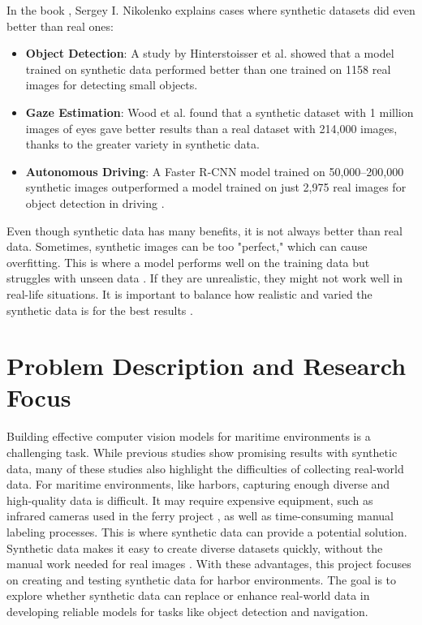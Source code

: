 \noindent In the book \cite{nikolenko2021synthetic}, Sergey I. Nikolenko explains cases where synthetic datasets did even better than real ones:
\begin{itemize}
    \item \textbf{Object Detection}: A study by Hinterstoisser et al. \cite{hinter} showed that a model trained on synthetic data performed better than one trained on 1158 real images for detecting small objects. 
    \item \textbf{Gaze Estimation}: Wood et al. \cite{wood} found that a synthetic dataset with 1 million images of eyes gave better results than a real dataset with 214,000 images, thanks to the greater variety in synthetic data. 
    \item \textbf{Autonomous Driving}: A Faster R-CNN model trained on 50,000--200,000 synthetic images outperformed a model trained on just 2,975 real images for object detection in driving \cite{r-cnn}.
\end{itemize}

\noindent Even though synthetic data has many benefits, it is not always better than real data. Sometimes, synthetic images can be too "perfect," which can cause overfitting. This is where a model performs well on the training data but struggles with unseen data \cite{Ying_2019}. If they are unrealistic, they might not work well in real-life situations. It is important to balance how realistic and varied the synthetic data is for the best results \cite{nikolenko2021synthetic}.


\section{Problem Description and Research Focus}
Building effective computer vision models for maritime environments is a challenging task. While previous studies show promising results with synthetic data, many of these studies also highlight the difficulties of collecting real-world data. For maritime environments, like harbors, capturing enough diverse and high-quality data is difficult. It may require expensive equipment, such as infrared cameras used in the ferry project \cite{NTNUFerry}, as well as time-consuming manual labeling processes. This is where synthetic data can provide a potential solution. \\

\noindent Synthetic data makes it easy to create diverse datasets quickly, without the manual work needed for real images \cite{nikolenko2021synthetic}. With these advantages, this project focuses on creating and testing synthetic data for harbor environments. The goal is to explore whether synthetic data can replace or enhance real-world data in developing reliable models for tasks like object detection and navigation.


